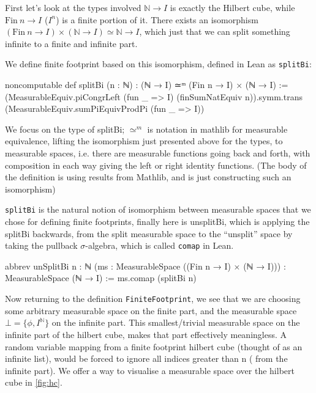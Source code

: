 First let's look at the types involved $\mathbb{N} \to I$ is exactly the Hilbert cube, while $\mathrm{Fin}\ n \to I$ ($I^n$) is a finite portion of it.
There exists an isomorphism $(\mathrm{Fin}\ n \to I) \times (\mathbb{N} \to I) \simeq \mathbb{N} \to I$, which just that we can split something infinite to a
finite and infinite part.

We define finite footprint based on this isomorphism, defined in Lean as \texttt{splitBi}:

\begin{leancode}
noncomputable def splitBi (n : ℕ) : (ℕ → I) ≃ᵐ (Fin n → I) × (ℕ → I) :=
  (MeasurableEquiv.piCongrLeft (fun _ => I) (finSumNatEquiv n)).symm.trans
  (MeasurableEquiv.sumPiEquivProdPi (fun _ => I))
\end{leancode}

We focus on the type of splitBi; $\simeq^m$ is notation in mathlib for measurable equivalence, lifting the isomorphism just presented above for the types,
to measurable spaces, i.e. there are measurable functions going back and forth, with composition in each way giving the left or right identity functions.
(The body of the definition is using results from Mathlib, and is just constructing such an isomorphism)

\texttt{splitBi} is the natural notion of isomorphism between measurable spaces that we chose for defining finite footprints, finally here is unsplitBi,
which is applying the splitBi backwards, from the split measurable space to the ``unsplit'' space by taking the pullback $\sigma$-algebra, which is called \texttt{comap}
in Lean.

\begin{leancode}
abbrev unSplitBi {n : ℕ} (ms : MeasurableSpace ((Fin n → I) × (ℕ → I)))
    : MeasurableSpace (ℕ → I) := ms.comap (splitBi n)
\end{leancode}

Now returning to the definition \texttt{FiniteFootprint}, we see that we are choosing some arbitrary measurable space on the finite part, and the
measurable space $\bot = \{\phi, I^\mathbb{N}\}$ on the infinite part. This smallest/trivial measurable space on the infinite part of the hilbert
cube, makes that part effectively meaningless. A random variable mapping from a finite footprint hilbert cube (thought of as an infinite list),
would be forced to ignore all indices greater than n (
from the infinite part). We offer a way to visualise a measurable space over the hilbert cube in \ref{fig:hc}.

